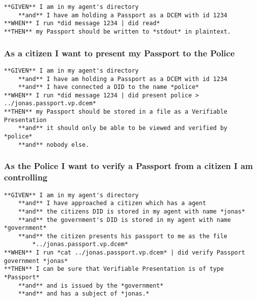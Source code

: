 \begin{lstlisting}
**GIVEN** I am in my agent's directory
    **and** I have am holding a Passport as a DCEM with id 1234
**WHEN** I run *did message 1234 | did read*
**THEN** my Passport should be written to *stdout* in plaintext.
\end{lstlisting}

\hypertarget{as-a-citizen-i-want-to-present-my-passport-to-the-police}{%
\subsubsection{As a citizen I want to present my Passport to the
Police}\label{as-a-citizen-i-want-to-present-my-passport-to-the-police}}

\begin{lstlisting}
**GIVEN** I am in my agent's directory
    **and** I have am holding a Passport as a DCEM with id 1234
    **and** I have connected a DID to the name *police*
**WHEN** I run *did message 1234 | did present police > ../jonas.passport.vp.dcem*
**THEN** my Passport should be stored in a file as a Verifiable Presentation
    **and** it should only be able to be viewed and verified by *police*
    **and** nobody else.
\end{lstlisting}

\hypertarget{as-the-police-i-want-to-verify-a-passport-from-a-citizen-i-am-controlling}{%
\subsubsection{As the Police I want to verify a Passport from a citizen
I am
controlling}\label{as-the-police-i-want-to-verify-a-passport-from-a-citizen-i-am-controlling}}

\begin{lstlisting}
**GIVEN** I am in my agent's directory
    **and** I have approached a citizen which has a agent
    **and** the citizens DID is stored in my agent with name *jonas*
    **and** the government's DID is stored in my agent with name *government*
    **and** the citizen presents his passport to me as the file 
        *../jonas.passport.vp.dcem*
**WHEN** I run *cat ../jonas.passport.vp.dcem* | did verify Passport government *jonas*
**THEN** I can be sure that Verifiable Presentation is of type *Passport*
    **and** and is issued by the *government*
    **and** and has a subject of *jonas.*
\end{lstlisting}
